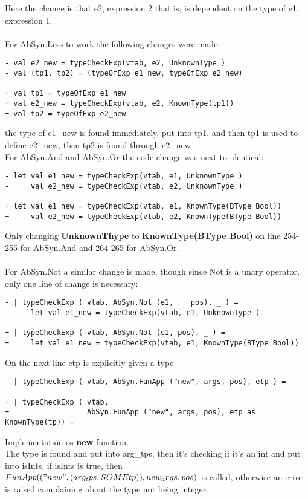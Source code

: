 Here the change is that e2, expression 2 that is, is dependent on the type of
e1, expression 1.\\
\\
For AbSyn.Less to work the following changes were made:
\begin{lstlisting}[style=MLStyle]
- val e2_new = typeCheckExp(vtab, e2, UnknownType )
- val (tp1, tp2) = (typeOfExp e1_new, typeOfExp e2_new)

+ val tp1 = typeOfExp e1_new
+ val e2_new = typeCheckExp(vtab, e2, KnownType(tp1))
+ val tp2 = typeOfExp e2_new 
\end{lstlisting}
the type of e1\_new is found immediately, put into tp1, and then tp1 is used to
define e2\_new, then tp2 is found through e2\_new
\\
For AbSyn.And and AbSyn.Or the code change was next to identical:
\begin{lstlisting}[style=MLStyle]
- let val e1_new = typeCheckExp(vtab, e1, UnknownType )
-     val e2_new = typeCheckExp(vtab, e2, UnknownType )

+ let val e1_new = typeCheckExp(vtab, e1, KnownType(BType Bool))
+     val e2_new = typeCheckExp(vtab, e2, KnownType(BType Bool))
\end{lstlisting}
Only changing \textbf{UnknownThype} to \textbf{KnownType(BType Bool)} on line
254-255 for AbSyn.And and 264-265 for AbSyn.Or.\\
\\
For AbSyn.Not a similar change is made, though since Not is a unary operator,
only one line of change is necessary:
\begin{lstlisting}[style=MLStyle]
- | typeCheckExp ( vtab, AbSyn.Not (e1,    pos), _ ) =
-     let val e1_new = typeCheckExp(vtab, e1, UnknownType )

+ | typeCheckExp ( vtab, AbSyn.Not (e1, pos), _ ) =
+     let val e1_new = typeCheckExp(vtab, e1, KnownType(BType Bool))
\end{lstlisting}
On the next line etp is explicitly given a type
\begin{lstlisting}[style=MLStyle]
- | typeCheckExp ( vtab, AbSyn.FunApp ("new", args, pos), etp ) =

+ | typeCheckExp ( vtab, 
+                  AbSyn.FunApp ("new", args, pos), etp as KnownType(tp)) =
\end{lstlisting}
Implementation os \textbf{new} function.\\
The type is found and put into arg\_tps, then it's checking if it's an int and
put into isInts, if isInts is true, then \emph{$FunApp(("new", (arg_tps, SOME
tp)), new_args, pos)$} is called, otherwise an error is raised complaining about
the type not being integer.

